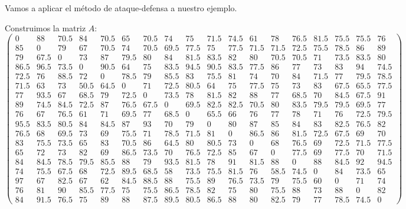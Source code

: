\begin{ejem} Vamos a aplicar el método de ataque-defensa a nuestro ejemplo.\\
\end{ejem}	
	Construimos la matriz $A$:
{\tiny 	\[ %
	\left(\begin{array}{cccccccccccccccccc}
	0 & 88 & 70.5 & 84 & 70.5 & 65 & 70.5 & 74 & 75 & 71.5 & 74.5 & 61 & 78 & 76.5 & 81.5 & 75.5 & 75.5 & 76 \\
	85 & 0 & 79 & 67 & 70.5 & 74 & 70.5 & 69.5 & 77.5 & 75 & 77.5 & 71.5 & 71.5 & 72.5 & 75.5 & 78.5 & 86 & 89 \\
	79 & 67.5 & 0 & 73 & 87 & 79.5 & 80 & 84 & 81.5 & 83.5 & 82 & 80 & 70.5 & 70.5 & 71 & 73.5 & 83.5 & 80 \\
	86.5 & 96.5 & 73.5 & 0 & 90.5 & 64 & 75 & 83.5 & 94.5 & 90.5 & 83.5 & 77.5 & 86 & 77 & 73 & 83 & 94 & 74.5 \\
	72.5 & 76 & 88.5 & 72 & 0 & 78.5 & 79 & 85.5 & 83 & 75.5 & 81 & 74 & 70 & 84 & 71.5 & 77 & 79.5 & 78.5 \\
	71.5 & 63 & 73 & 50.5 & 64.5 & 0 & 71 & 72.5 & 80.5 & 64 & 75 & 77.5 & 75 & 73 & 83 & 67.5 & 65.5 & 77.5 \\
	77 & 93.5 & 67 & 68.5 & 79 & 72.5 & 0 & 73.5 & 78 & 81.5 & 82 & 88 & 77 & 68.5 & 70 & 84.5 & 67.5 & 91 \\
	89 & 74.5 & 84.5 & 72.5 & 87 & 76.5 & 67.5 & 0 & 69.5 & 82.5 & 82.5 & 70.5 & 80 & 83.5 & 79.5 & 79.5 & 69.5 & 77 \\
	76 & 67 & 76.5 & 61 & 71 & 69.5 & 77 & 68.5 & 0 & 65.5 & 66 & 76 & 77 & 78 & 71 & 76 & 72.5 & 79.5 \\
	95.5 & 83.5 & 80.5 & 84 & 84.5 & 87 & 93 & 70 & 79 & 0 & 80 & 87 & 85 & 84 & 83 & 82.5 & 76.5 & 82 \\
	76.5 & 68 & 69.5 & 73 & 69 & 75.5 & 71 & 78.5 & 71.5 & 81 & 0 & 86.5 & 86 & 81.5 & 72.5 & 67.5 & 69 & 70 \\
	83 & 75.5 & 73.5 & 65 & 83 & 70.5 & 86 & 64.5 & 80 & 80.5 & 73 & 0 & 68 & 76.5 & 69 & 72.5 & 71.5 & 77.5 \\
	65 & 72 & 73 & 82 & 69 & 86.5 & 73.5 & 70 & 76.5 & 72.5 & 85 & 67 & 0 & 77.5 & 69 & 77.5 & 70 & 71.5 \\
	84 & 84.5 & 78.5 & 79.5 & 85.5 & 88 & 79 & 93.5 & 81.5 & 78 & 91 & 81.5 & 88 & 0 & 88 & 84.5 & 92 & 94.5 \\
	74 & 75.5 & 67.5 & 68 & 72.5 & 89.5 & 68.5 & 58 & 73.5 & 75.5 & 81.5 & 76 & 58.5 & 74.5 & 0 & 84 & 73.5 & 65 \\
	97 & 67 & 82.5 & 67 & 62 & 84.5 & 88.5 & 88 & 75.5 & 89 & 76.5 & 73.5 & 79 & 75.5 & 60 & 0 & 71 & 74 \\
	76 & 81 & 90 & 85.5 & 77.5 & 75 & 75.5 & 86.5 & 78.5 & 82 & 75 & 80 & 75.5 & 88 & 73 & 88 & 0 & 82 \\
	84 & 91.5 & 76.5 & 75 & 89 & 88 & 87.5 & 89.5 & 80.5 & 86.5 & 88 & 80 & 82.5 & 79 & 77 & 78.5 & 74.5 & 0 	
	\end{array} \right) 
	\]}
	
